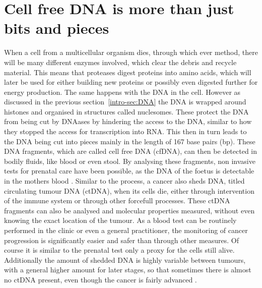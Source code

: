 \section[cfDNA]{Cell free DNA is more than just bits and pieces}
\label{intro-sec:ctDNA}

When a cell from a multicellular organism dies, through which ever method, there will be many different enzymes involved, which clear the debris and recycle material. This means that proteases digest proteins into amino acids, which will later be used for either building new proteins or possibly even digested further for energy production. The same happens with the DNA in the cell. However as discussed in the previous section~\ref{intro-sec:DNA} the DNA is wrapped around histones and organised in structures called nuclesomes. These protect the DNA from being cut by DNAases by hindering the access to the DNA, similar to how they stopped the access for transcription into RNA. This then in turn leads to the DNA being cut into pieces mainly in the length of 167 base pairs (bp). 
These DNA fragments, which are called cell free DNA (cfDNA), can then be detected in bodily fluids, like blood or even stool. By analysing these fragments, non invasive tests for prenatal care have been possible, as the DNA of the foetus is detectable in the mothers blood \cite{Dan2012,Nicolaides2013}.
Similar to the process, a cancer also sheds DNA, titled circulating tumour DNA (ctDNA), when its cells die, either through intervention of the immune system or through other forcefull processes. These ctDNA fragments can also be analysed and molecular properties measured, without even knowing the exact location of the tumour. As a blood test can be routinely performed in the clinic or even a general practitioner, the monitoring of cancer progression is significantly easier and safer than through other measures. Of course it is similar to the prenatal test only a proxy for the cells still alive. Additionally the amount of shedded DNA is highly variable between tumours, with a general higher amount for later stages, so that sometimes there is almost no ctDNA present, even though the cancer is fairly advanced \cite{Diehl2008,Schwarzenbach2011}.